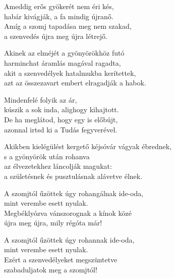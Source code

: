 \begin{dhpverse}

 Ameddig erős gyökerét nem éri kés,\\
habár kivágják, a fa mindig újranő.\\
Amíg a szomj tapadása meg nem szakad,\\
a szenvedés újra meg újra létrejő.

 Akinek az elméjét a gyönyörökhöz futó\\
harminchat áramlás magával ragadta,\\
akit a szenvedélyek hatalmukba kerítettek,\\
azt az összezavart embert elragadják a habok.

 Mindenfelé folyik az ár,\\
kúszik a sok inda, alighogy kihajtott.\\
De ha meglátod, hogy egy is előbújt,\\
azonnal irtsd ki a Tudás fegyverével.

 Akikben kielégülést kergető kéjsóvár vágyak ébrednek,\\
s a gyönyörök után rohanva\\
az élvezetekhez láncolják magukat:\\
a születésnek és pusztulásnak alávetve élnek.

 A szomjtól űzöttek úgy rohangálnak ide-oda,\\
mint verembe esett nyulak.\\
Megbéklyózva vánszorognak a kínok közé\\
újra meg újra, mily régóta már!

 A szomjtól űzöttek úgy rohannak ide-oda,\\
mint verembe esett nyulak.\\
Ezért a szenvedélyeket megszüntetve\\
szabaduljatok meg a szomjtól!

\end{dhpverse}
\newpage
